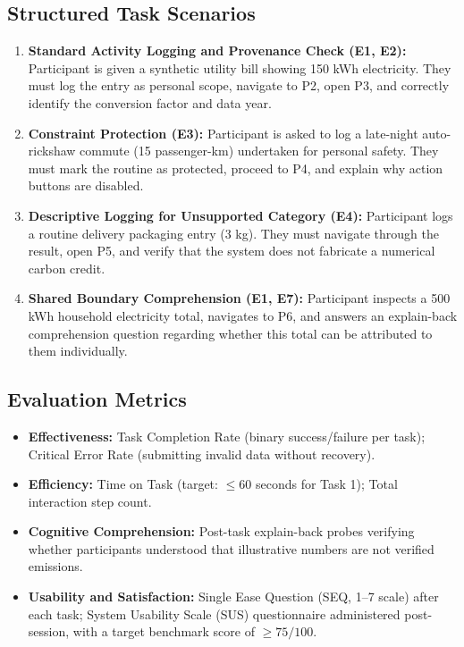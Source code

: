 \documentclass[12pt,a4paper]{article}
\begin{document}
\subsection{Structured Task Scenarios}
\begin{enumerate}[label=\textbf{Task \arabic*:},leftmargin=*]
  \item \textbf{Standard Activity Logging and Provenance Check (E1, E2):} Participant is given a synthetic utility bill showing 150 kWh electricity. They must log the entry as personal scope, navigate to P2, open P3, and correctly identify the conversion factor and data year.
  \item \textbf{Constraint Protection (E3):} Participant is asked to log a late-night auto-rickshaw commute (15 passenger-km) undertaken for personal safety. They must mark the routine as protected, proceed to P4, and explain why action buttons are disabled.
  \item \textbf{Descriptive Logging for Unsupported Category (E4):} Participant logs a routine delivery packaging entry (3 kg). They must navigate through the result, open P5, and verify that the system does not fabricate a numerical carbon credit.
  \item \textbf{Shared Boundary Comprehension (E1, E7):} Participant inspects a 500 kWh household electricity total, navigates to P6, and answers an explain-back comprehension question regarding whether this total can be attributed to them individually.
\end{enumerate}

\subsection{Evaluation Metrics}
\begin{itemize}[leftmargin=*]
  \item \textbf{Effectiveness:} Task Completion Rate (binary success/failure per task); Critical Error Rate (submitting invalid data without recovery).
  \item \textbf{Efficiency:} Time on Task (target: $\le 60$ seconds for Task 1); Total interaction step count.
  \item \textbf{Cognitive Comprehension:} Post-task explain-back probes verifying whether participants understood that illustrative numbers are not verified emissions.
  \item \textbf{Usability and Satisfaction:} Single Ease Question (SEQ, 1--7 scale) after each task; System Usability Scale (SUS) questionnaire administered post-session, with a target benchmark score of $\ge 75/100$.
\end{itemize}
\end{document}
